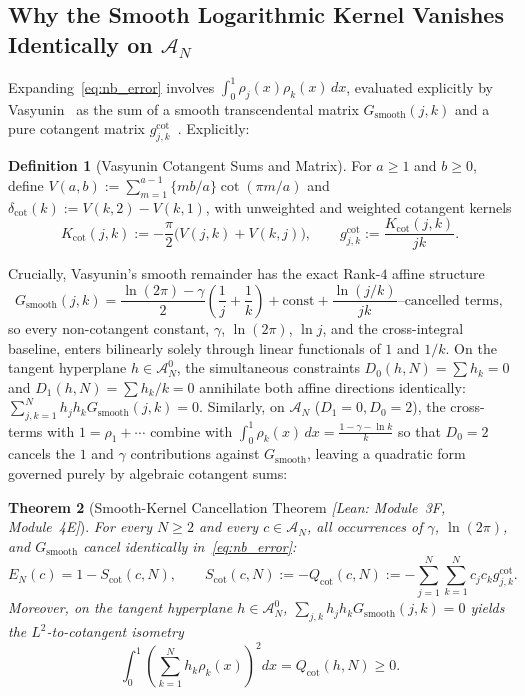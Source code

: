 \documentclass[11pt,a4paper]{article}
\newtheorem{theorem}{Theorem}[section]
\theoremstyle{definition}
\newtheorem{definition}[theorem]{Definition}
\begin{document}
\subsection{Why the Smooth Logarithmic Kernel Vanishes Identically on $\mathcal{A}_N$}

Expanding~\eqref{eq:nb_error} involves $\int_0^1 \rho_j(x)\rho_k(x)\,dx$, evaluated explicitly by Vasyunin~\cite{Vasyunin1995} as the sum of a smooth transcendental matrix $G_{\mathrm{smooth}}(j,k)$ and a pure cotangent matrix $g_{j,k}^{\mathrm{cot}}$~\cite{BettinConrey2013,MaierRassias2016}. Explicitly:
\begin{definition}[Vasyunin Cotangent Sums and Matrix]
For $a \ge 1$ and $b \ge 0$, define $V(a,b) := \sum_{m=1}^{a-1} \{mb/a\} \cot(\pi m/a)$ and $\delta_{\mathrm{cot}}(k) := V(k,2) - V(k,1)$, with unweighted and weighted cotangent kernels
\[
K_{\mathrm{cot}}(j,k) := -\frac{\pi}{2}\bigl(V(j,k) + V(k,j)\bigr), \qquad
g_{j,k}^{\mathrm{cot}} := \frac{K_{\mathrm{cot}}(j,k)}{jk}.
\]
\end{definition}
Crucially, Vasyunin's smooth remainder has the exact Rank-$4$ affine structure
\[
G_{\mathrm{smooth}}(j,k) = \frac{\ln(2\pi) - \gamma}{2}\left(\frac{1}{j} + \frac{1}{k}\right) + \text{const} + \frac{\ln(j/k)}{jk}\text{--cancelled terms},
\]
so every non-cotangent constant, $\gamma$, $\ln(2\pi)$, $\ln j$, and the cross-integral baseline, enters bilinearly solely through linear functionals of $1$ and $1/k$. On the tangent hyperplane $h \in \mathcal{A}_N^0$, the simultaneous constraints $D_0(h,N) = \sum h_k = 0$ and $D_1(h,N) = \sum h_k/k = 0$ annihilate both affine directions identically: $\sum_{j,k=1}^N h_j h_k G_{\mathrm{smooth}}(j,k) = 0$. Similarly, on $\mathcal{A}_N$ ($D_1=0, D_0=2$), the cross-terms with $1 = \rho_1 + \cdots$ combine with $\int_0^1 \rho_k(x)\,dx = \frac{1 - \gamma - \ln k}{k}$ so that $D_0 = 2$ cancels the $1$ and $\gamma$ contributions against $G_{\mathrm{smooth}}$, leaving a quadratic form governed purely by algebraic cotangent sums:

\begin{theorem}[Smooth-Kernel Cancellation Theorem \emph{[Lean: Module~3F, Module~4E]}]\label{thm:scot_reduction}
For every $N \ge 2$ and every $c \in \mathcal{A}_N$, all occurrences of $\gamma$, $\ln(2\pi)$, and $G_{\mathrm{smooth}}$ cancel identically in~\eqref{eq:nb_error}:
\begin{equation}\label{eq:e_scot}
E_N(c) = 1 - S_{\mathrm{cot}}(c, N), \qquad
S_{\mathrm{cot}}(c, N) := -Q_{\mathrm{cot}}(c, N) := -\sum_{j=1}^N \sum_{k=1}^N c_j c_k g_{j,k}^{\mathrm{cot}}.
\end{equation}
Moreover, on the tangent hyperplane $h \in \mathcal{A}_N^0$, $\sum_{j,k} h_j h_k G_{\mathrm{smooth}}(j,k) = 0$ yields the $L^2$-to-cotangent isometry
\begin{equation}\label{eq:tangent_isom}
\int_0^1 \left(\sum_{k=1}^N h_k \rho_k(x)\right)^2 dx = Q_{\mathrm{cot}}(h, N) \ge 0.
\end{equation}
\end{theorem}
\end{document}
